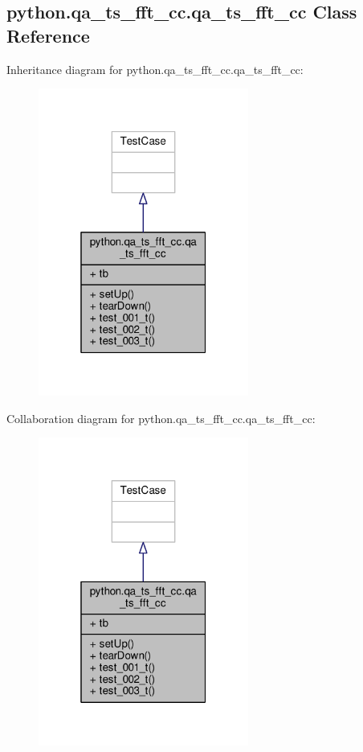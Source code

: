 \subsection{python.\+qa\+\_\+ts\+\_\+fft\+\_\+cc.\+qa\+\_\+ts\+\_\+fft\+\_\+cc Class Reference}
\label{classpython_1_1qa__ts__fft__cc_1_1qa__ts__fft__cc}


Inheritance diagram for python.\+qa\+\_\+ts\+\_\+fft\+\_\+cc.\+qa\+\_\+ts\+\_\+fft\+\_\+cc\+:
\nopagebreak
\begin{figure}[H]
\begin{center}
\leavevmode
\includegraphics[width=196pt]{da/d46/classpython_1_1qa__ts__fft__cc_1_1qa__ts__fft__cc__inherit__graph}
\end{center}
\end{figure}


Collaboration diagram for python.\+qa\+\_\+ts\+\_\+fft\+\_\+cc.\+qa\+\_\+ts\+\_\+fft\+\_\+cc\+:
\nopagebreak
\begin{figure}[H]
\begin{center}
\leavevmode
\includegraphics[width=196pt]{d5/d10/classpython_1_1qa__ts__fft__cc_1_1qa__ts__fft__cc__coll__graph}
\end{center}
\end{figure}
